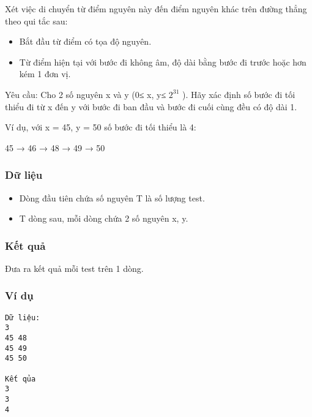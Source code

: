 

   Xét việc di chuyển từ điểm nguyên này đến điểm nguyên khác trên đường thẳng theo qui tắc sau:  
\begin{itemize}
	\item     Bắt đầu từ điểm có tọa độ nguyên.   
	\item     Từ điểm hiện tại với bước đi không âm, độ dài bằng bước đi trước hoặc hơn kém 1 đơn vị.   
\end{itemize}

   Yêu cầu: Cho 2 số nguyên x và y (0≤ x, y≤ $2^{31}$   ). Hãy xác định số bước đi tối thiểu đi từ x đến y với   bước đi ban đầu và bước đi cuối cùng đều có độ dài 1.  

   Ví dụ, với x = 45, y = 50 số bước đi tối thiểu là 4:  

   45 → 46 → 48 → 49 → 50  

\subsubsection{   Dữ liệu  }
\begin{itemize}
	\item     Dòng đầu tiên chứa số nguyên T là số lượng test.   
	\item     T dòng sau, mỗi dòng chứa 2 số nguyên x, y.   
\end{itemize}

\subsubsection{   Kết quả  }

   Đưa ra kết quả mỗi test trên 1 dòng.  

\subsubsection{   Ví dụ  }
\begin{verbatim}
Dữ liệu:
3
45 48
45 49
45 50

Kết qủa
3
3
4
\end{verbatim}
